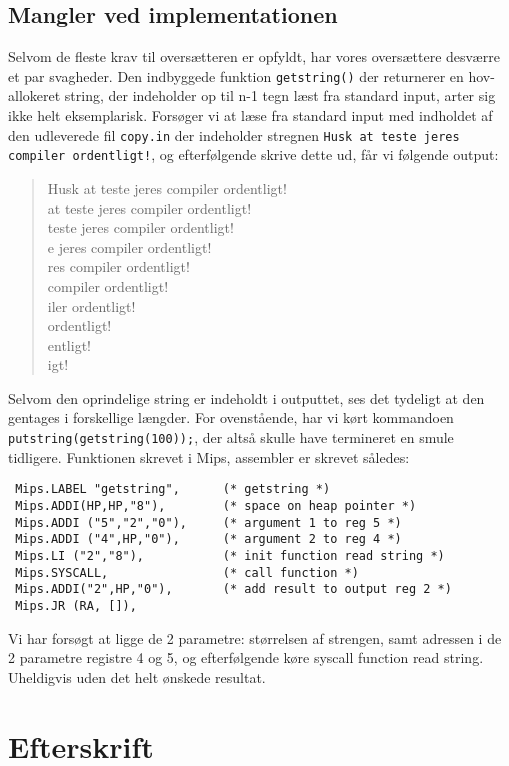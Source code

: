 \documentclass[12pt]{article}
\begin{document}
\subsection{Mangler ved implementationen}

Selvom de fleste krav til oversætteren er opfyldt, har vores oversættere
desværre et par svagheder. Den indbyggede funktion \texttt{getstring()} der returnerer en hov-allokeret string, der indeholder op til n-1 tegn læst fra standard input, arter sig ikke helt eksemplarisk. Forsøger vi at læse fra standard input med indholdet af den udleverede fil \texttt{copy.in} der indeholder stregnen \texttt{Husk at teste jeres compiler ordentligt!}, og efterfølgende skrive dette ud, får vi følgende output:\\

\begin{quote}
Husk at teste jeres compiler ordentligt! \\
 at teste jeres compiler ordentligt! \\
teste jeres compiler ordentligt! \\
e jeres compiler ordentligt! \\
res compiler ordentligt! \\	
compiler ordentligt! \\
iler ordentligt! \\
 ordentligt! \\
entligt!\\
igt!
\end{quote}

Selvom den oprindelige string er indeholdt i outputtet, ses det tydeligt at den
gentages i forskellige længder. For ovenstående, har vi kørt kommandoen
\texttt{putstring(getstring(100));}, der altså skulle have termineret en smule
tidligere. Funktionen skrevet i Mips, assembler er skrevet således:

\begin{verbatim}
 Mips.LABEL "getstring",      (* getstring *)
 Mips.ADDI(HP,HP,"8"),        (* space on heap pointer *)
 Mips.ADDI ("5","2","0"),     (* argument 1 to reg 5 *)  
 Mips.ADDI ("4",HP,"0"),      (* argument 2 to reg 4 *)    
 Mips.LI ("2","8"),           (* init function read string *)
 Mips.SYSCALL,                (* call function *)
 Mips.ADDI("2",HP,"0"),       (* add result to output reg 2 *)    
 Mips.JR (RA, []),
\end{verbatim}

Vi har forsøgt at ligge de 2 parametre: størrelsen af strengen, samt adressen i
de 2 parametre registre 4 og 5, og efterfølgende køre syscall function
read string. Uheldigvis uden det helt ønskede resultat.

\section{Efterskrift}

{}

\end{document}
